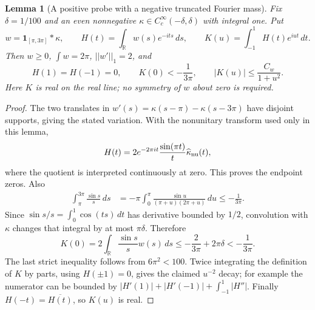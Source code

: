\documentclass[11pt]{article}
\def\norm#1{||#1||}%
\newtheorem{lemma}[theorem]{Lemma}
\theoremstyle{remark}
\newcommand{\norm}[1]{\left\lVert #1\right\rVert}
\begin{document}
\begin{lemma}[A positive probe with a negative truncated Fourier mass]
\label{lem:v137-probe}
Fix $\delta=1/100$ and an even nonnegative
$\kappa\in C_c^\infty(-\delta,\delta)$ with integral one. Put
\[
 w=\mathbf1_{[\pi,3\pi]}*\kappa,\qquad
 H(t)=\int_{\mathbb R}w(s)e^{-its}\,ds,\qquad
 K(u)=\int_{-1}^1H(t)e^{iut}\,dt.
\]
Then $w\ge0$, $\int w=2\pi$, $\norm{w'}_1=2$, and
\begin{equation}\label{eq:v137-probe-properties}
 H(1)=H(-1)=0,\qquad
 K(0)<-\frac1{3\pi},\qquad
 |K(u)|\le\frac{C_w}{1+u^2}.
\end{equation}
Here $K$ is real on the real line; no symmetry of $w$ about zero is
required.
\end{lemma}
\begin{proof}
The two translates in $w'(s)=\kappa(s-\pi)-\kappa(s-3\pi)$ have
disjoint supports, giving the stated variation. With the nonunitary
transform used only in this lemma,
\[
 H(t)=2e^{-2\pi it}\frac{\sin(\pi t)}{t}\widehat\kappa_{\rm nu}(t),
\]
where the quotient is interpreted continuously at zero. This proves
the endpoint zeros. Also
\begin{align*}
 \int_\pi^{3\pi}\frac{\sin s}{s}\,ds
 &=-\pi\int_0^\pi
       \frac{\sin u}{(\pi+u)(2\pi+u)}\,du
 \le-\frac1{3\pi}.
\end{align*}
Since $\sin s/s=\int_0^1\cos(ts)\,dt$ has derivative bounded by
$1/2$, convolution with $\kappa$ changes that integral by at most
$\pi\delta$. Therefore
\[
 K(0)=2\int_{\mathbb R}\frac{\sin s}{s}w(s)\,ds
 \le-\frac2{3\pi}+2\pi\delta<-\frac1{3\pi}.
\]
The last strict inequality follows from $6\pi^2<100$.
Twice integrating the definition of $K$ by parts, using $H(\pm1)=0$,
gives the claimed $u^{-2}$ decay; for example the numerator can be
bounded by $|H'(1)|+|H'(-1)|+\int_{-1}^1|H''|$.
Finally $H(-t)=\overline{H(t)}$, so $K(u)$ is real.
\end{proof}
\end{document}
